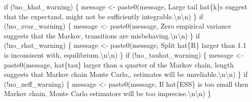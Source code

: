 \documentclass[
  letterpaper,
  DIV=11,
  numbers=noendperiod]{scrartcl}
\newenvironment{Shaded}{\begin{snugshade}}{\end{snugshade}}
\newcommand{\ControlFlowTok}[1]{\textcolor[rgb]{0.00,0.23,0.31}{#1}}
\newcommand{\FunctionTok}[1]{\textcolor[rgb]{0.28,0.35,0.67}{#1}}
\newcommand{\NormalTok}[1]{\textcolor[rgb]{0.00,0.23,0.31}{#1}}
\newcommand{\OtherTok}[1]{\textcolor[rgb]{0.00,0.23,0.31}{#1}}
\newcommand{\SpecialCharTok}[1]{\textcolor[rgb]{0.37,0.37,0.37}{#1}}
\newcommand{\StringTok}[1]{\textcolor[rgb]{0.13,0.47,0.30}{#1}}
\begin{document}
\begin{Shaded}
\begin{Highlighting}[]
  \ControlFlowTok{if}\NormalTok{ (}\SpecialCharTok{!}\NormalTok{no\_khat\_warning) \{}
\NormalTok{    message }\OtherTok{\textless{}{-}} \FunctionTok{paste0}\NormalTok{(message,}
                      \StringTok{\textquotesingle{}Large tail hat\{k\}s suggest that the expectand\textquotesingle{}}\NormalTok{,}
                      \StringTok{\textquotesingle{} might not be sufficiently integrable.}\SpecialCharTok{\textbackslash{}n\textbackslash{}n}\StringTok{\textquotesingle{}}\NormalTok{)}
\NormalTok{  \}}
  \ControlFlowTok{if}\NormalTok{ (}\SpecialCharTok{!}\NormalTok{no\_zvar\_warning) \{}
\NormalTok{    message }\OtherTok{\textless{}{-}} \FunctionTok{paste0}\NormalTok{(message,}
                      \StringTok{\textquotesingle{}Zero empirical variance suggests that the Markov\textquotesingle{}}\NormalTok{,}
                      \StringTok{\textquotesingle{} transitions are misbehaving.}\SpecialCharTok{\textbackslash{}n\textbackslash{}n}\StringTok{\textquotesingle{}}\NormalTok{)}
\NormalTok{  \}}
  \ControlFlowTok{if}\NormalTok{ (}\SpecialCharTok{!}\NormalTok{no\_rhat\_warning) \{}
\NormalTok{    message }\OtherTok{\textless{}{-}} \FunctionTok{paste0}\NormalTok{(message,}
                      \StringTok{\textquotesingle{}Split hat\{R\} larger than 1.1 is inconsisent with\textquotesingle{}}\NormalTok{, }\StringTok{\textquotesingle{} equilibrium.}\SpecialCharTok{\textbackslash{}n\textbackslash{}n}\StringTok{\textquotesingle{}}\NormalTok{)}
\NormalTok{  \}}
  \ControlFlowTok{if}\NormalTok{ (}\SpecialCharTok{!}\NormalTok{no\_tauhat\_warning) \{}
\NormalTok{    message }\OtherTok{\textless{}{-}} \FunctionTok{paste0}\NormalTok{(message,}
                      \StringTok{\textquotesingle{}hat\{tau\} larger than a quarter of the Markov chain\textquotesingle{}}\NormalTok{,}
                      \StringTok{\textquotesingle{} length suggests that Markov chain Monte Carlo,\textquotesingle{}}\NormalTok{,}
                      \StringTok{\textquotesingle{} estimates will be unreliable.}\SpecialCharTok{\textbackslash{}n\textbackslash{}n}\StringTok{\textquotesingle{}}\NormalTok{)}
\NormalTok{  \}}
  \ControlFlowTok{if}\NormalTok{ (}\SpecialCharTok{!}\NormalTok{no\_neff\_warning) \{}
\NormalTok{    message }\OtherTok{\textless{}{-}} \FunctionTok{paste0}\NormalTok{(message,}
                      \StringTok{\textquotesingle{}If hat\{ESS\} is too small then Markov chain\textquotesingle{}}\NormalTok{,}
                      \StringTok{\textquotesingle{} Monte Carlo estimators will be too imprecise.}\SpecialCharTok{\textbackslash{}n\textbackslash{}n}\StringTok{\textquotesingle{}}\NormalTok{)}
\NormalTok{  \}}


\end{Highlighting}
\end{Shaded}
\end{document}
